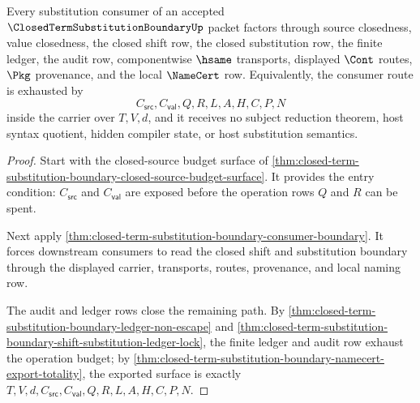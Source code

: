 \begin{theorem}
\label{thm:closed-term-substitution-boundary-substitution-budget-totality}
Every substitution consumer of an accepted $\ClosedTermSubstitutionBoundaryUp$ packet factors through source closedness, value closedness, the closed shift row, the closed substitution row, the finite ledger, the audit row, componentwise $\hsame$ transports, displayed $\Cont$ routes, $\Pkg$ provenance, and the local $\NameCert$ row. Equivalently, the consumer route is exhausted by
$$
C_{\mathsf{src}},C_{\mathsf{val}},Q,R,L,A,H,C,P,N
$$
inside the carrier over $T,V,d$, and it receives no subject reduction theorem, host syntax quotient, hidden compiler state, or host substitution semantics.
\end{theorem}
\begin{proof}
Start with the closed-source budget surface of \autoref{thm:closed-term-substitution-boundary-closed-source-budget-surface}. It provides the entry condition: $C_{\mathsf{src}}$ and $C_{\mathsf{val}}$ are exposed before the operation rows $Q$ and $R$ can be spent.

Next apply \autoref{thm:closed-term-substitution-boundary-consumer-boundary}. It forces downstream consumers to read the closed shift and substitution boundary through the displayed carrier, transports, routes, provenance, and local naming row.

The audit and ledger rows close the remaining path. By \autoref{thm:closed-term-substitution-boundary-ledger-non-escape} and \autoref{thm:closed-term-substitution-boundary-shift-substitution-ledger-lock}, the finite ledger and audit row exhaust the operation budget; by \autoref{thm:closed-term-substitution-boundary-namecert-export-totality}, the exported surface is exactly $T,V,d,C_{\mathsf{src}},C_{\mathsf{val}},Q,R,L,A,H,C,P,N$.
\end{proof}

